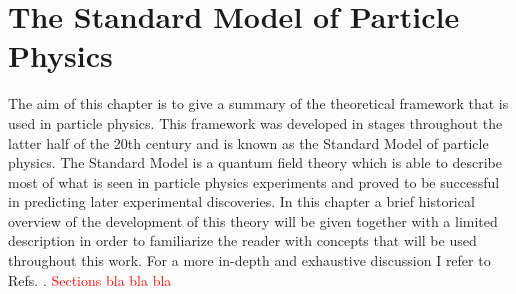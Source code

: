 
\chapter{The Standard Model of Particle Physics}
\label{ch:SM}
The aim of this chapter is to give a summary of the theoretical framework that is used in particle physics.
This framework was developed in stages throughout the latter half of the 20th century and is known as the Standard Model of particle physics.
The Standard Model is a quantum field theory which is able to describe most of what is seen in particle physics experiments and proved to be successful in predicting later experimental discoveries.
In this chapter a brief historical overview of the development of this theory will be given together with a limited description in order to familiarize the reader with concepts that will be used throughout this work.
For a more in-depth and exhaustive discussion I refer to Refs. \cite{Povh,Peskin:1995ev,Agashe:2014kda,Bettini:2008zz}. \textcolor{red}{Sections bla bla bla}

